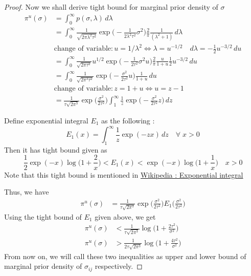 \begin{proof}
    Now we shall derive tight bound for marginal prior density of $\sigma$
    \begin{align*}
        \pi^u(\sigma) &= \int_0^\infty p(\sigma, \lambda) \, d\lambda \\
        &= \int_0^\infty \frac{1}{\sqrt{2\pi \lambda^2 \tau^2}}\exp\Big(-\frac{1}{2\lambda^2 \tau^2}\sigma^2 \Big) \frac{2}{\pi} \frac{1}{(\lambda^2+1)} \, d\lambda \\
        & \text{change of variable} : u = 1 / \lambda^2 \Leftrightarrow \lambda = u^{-1/2} \quad d\lambda = -\frac{1}{2} u^{-3/2}\, du \\
        &= \int_0^\infty \frac{1}{\sqrt{2\pi \tau^2}} u^{1/2}\exp\Big(-\frac{1}{2\tau^2}\sigma^2 u \Big) \frac{2}{\pi}\frac{u}{1+u} \frac{1}{2}u^{-3/2}\, du \\
        &= \int_0^\infty \frac{1}{\sqrt{2\pi^3 \tau^2}} \exp\Big(-\frac{\sigma^2}{2\tau^2} u \Big) \frac{1}{1+u} \, du \\
        & \text{change of variable} : z = 1+u \Leftrightarrow u = z-1 \\
        &= \frac{1}{\tau \sqrt{2\pi^3}} \exp\Big(\frac{\sigma^2}{2\tau^2} \Big) \int_1^\infty \frac{1}{z} \exp\Big(-\frac{\sigma^2}{2\tau^2}z \Big)\, dz
    \end{align*}

    Define exponential integral $E_1$ as the following : \[E_1(x) = \int_1^\infty \frac{1}{z}\exp(-zx)\, dz \quad \forall \; x>0  \] Then it has tight bound given as \[\frac{1}{2}\exp(-x)\log\Big( 1+ \frac{2}{x}\Big) < E_1(x) < \exp(-x)\log\Big(1+\frac{1}{x} \Big) \quad x>0 \] 
    Note that this tight bound is mentioned in \href{https://en.wikipedia.org/wiki/Exponentia\_integral}{Wikipedia : Exponential integral}

    Thus, we have 
    \begin{align*}
        \pi^u(\sigma) &= \frac{1}{\tau \sqrt{2\pi^3}} \exp\Big(\frac{\sigma^2}{2\tau^2} \Big) E_1\Big(\frac{\sigma^2}{2\tau^2} \Big)
    \end{align*}
    Using the tight bound of $E_1$ given above, we get
    \begin{align*}
        \pi^u(\sigma) &< \frac{1}{\tau \sqrt{2\pi^3}}\log\Big(1+\frac{2\tau^2}{\sigma^2} \Big) \\
        \pi^u(\sigma) &> \frac{1}{2\tau \sqrt{2\pi^3}}\log\Big(1+\frac{4\tau^2}{\sigma^2} \Big) 
    \end{align*}
    From now on, we will call these two inequalities as upper and lower bound of marginal prior density of $\sigma_{ij}$ respectively. 


\end{proof}
